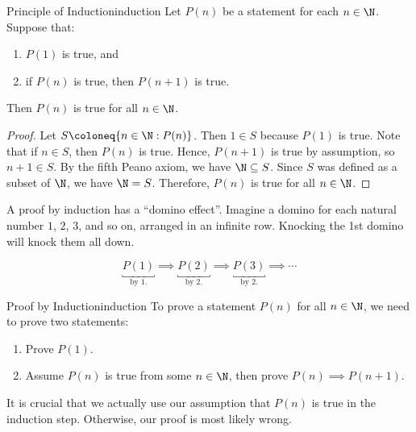 \begin{thmbox}{Principle of Induction}{induction}
    Let $P(n)$ be a statement for each $n \in \N$. Suppose that:
    \begin{enumerate}[noitemsep]
        \item $P(1)$ is true, and
        \item if $P(n)$ is true, then $P(n+1)$ is true.
    \end{enumerate}
    Then $P(n)$ is true for all $n \in \N$.
    \tcblower
    \begin{proof}
        Let $S \coloneq \{ n \in \N : P(n) \}$. Then $1 \in S$ because $P(1)$ is true. Note that if $n \in S$, then $P(n)$ is true. Hence, $P(n+1)$ is true by assumption, so $n+1 \in S$. By the fifth Peano axiom, we have $\N \subseteq S$. Since $S$ was defined as a subset of $\N$, we have $\N = S$. Therefore, $P(n)$ is true for all $n \in \N$.
    \end{proof}
\end{thmbox}

A proof by induction has a ``domino effect''. Imagine a domino for each natural number $1$, $2$, $3$, and so on, arranged in an infinite row. Knocking the 1st domino will knock them all down.


\[ \underbracket{P(1)}_{\text{by 1.}} \implies \underbracket{P(2)}_{\text{by 2.}} \implies \underbracket{P(3)}_{\text{by 2.}} \implies \cdots \]

\begin{tecbox}{Proof by Induction}{induction}
    To prove a statement $P(n)$ for all $n \in \N$, we need to prove two statements:
    \begin{enumerate}
        \item {} Prove $P(1)$.
        \item {} Assume $P(n)$ is true from some $n \in \N$, then prove $P(n) \implies P(n+1)$.
    \end{enumerate}
\end{tecbox}

It is crucial that we actually use our assumption that $P(n)$ is true in the induction step. Otherwise, our proof is most likely wrong.

